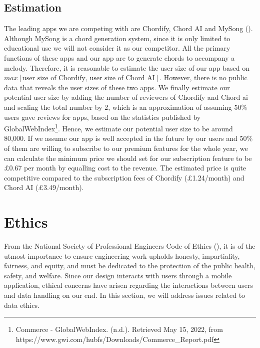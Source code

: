 \subsection{Estimation}
The leading apps we are competing with are Chordify, Chord AI and MySong (\cite{MySong}). Although MySong is a chord generation system, since it is only limited to educational use we will not consider it as our competitor. All the primary functions of these apps and our app are to generate chords to accompany a melody.  Therefore, it is reasonable to estimate the user size of our app based on $max[\text{user size of Chordify, user size of Chord AI}]$. However, there is no public data that reveals the user sizes of these two apps. We finally estimate our potential user size by adding the number of reviewers of Chordify and Chord ai and scaling the total number by 2, which is an approximation of assuming 50\% users gave reviews for apps, based on the statistics published by GlobalWebIndex\footnote{Commerce - GlobalWebIndex. (n.d.). Retrieved May 15, 2022, from https://www.gwi.com/hubfs/Downloads/Commerce\_Report.pdf}. Hence, we estimate our potential user size to be around 80,000. If we assume our app is well accepted in the future by our users and 50\% of them are willing to subscribe to our premium features for the whole year, we can calculate the minimum price we should set for our subscription feature to be £0.67 per month by equalling cost to the revenue. The estimated price is quite competitive compared to the subscription fees of Chordify (£1.24/month) and Chord AI (£3.49/month).
\section{Ethics}
\label{sec:dataethics}
From the National Society of Professional Engineers Code of Ethics (\cite{codeofethics}), it is of the utmost 
importance to ensure engineering work upholds honesty, impartiality, fairness, and equity, and must be dedicated to 
the protection of the public health, safety, and welfare. Since our design interacts with users
through a mobile application, ethical concerns have arisen regarding the interactions between users 
and data handling on our end. In this section, we will address issues related to data ethics.


